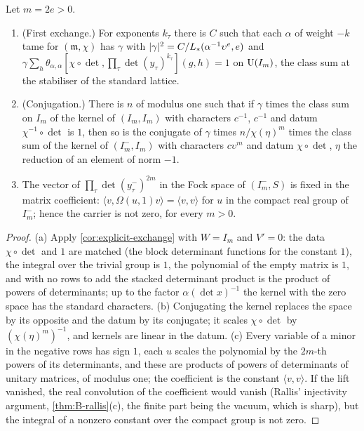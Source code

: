 \begin{lemma}\label{lem:carrier}
Let $m=2e>0$.
\begin{enumerate}[label=\textup{(\alph*)}]
\item (First exchange.) For exponents $k_\tau$ there is $C$ such that each $\alpha$ of weight $-k$ tame for $(\mathfrak m,\chi)$ has $\gamma$ with $\lvert \gamma\rvert^2=C/L_*(\alpha^{-1}\upsilon^e,e)$ and $\gamma\sum_h\theta_{\alpha,\alpha}[\chi\circ\det,\prod_\tau\det(y_\tau)^{k_\tau}](g,h)=1$ on
$\operatorname{U}(I_m)$, the class sum at the stabiliser of the standard lattice.
\item (Conjugation.) There is $n$ of modulus one such that if $\gamma$ times the class sum on $I_m$ of the kernel of $(I_m,I_m)$ with characters $c^{-1}$, $c^{-1}$ and datum $\chi^{-1}\circ\det$ is $1$, then so is the conjugate of $\gamma$ times
$n/\chi(\eta)^m$ times the class sum of the kernel of $(I_m^-,I_m)$ with characters $c\upsilon^m$ and datum $\chi\circ\det$, $\eta$ the reduction of an element of norm $-1$.
\item The vector of $\prod_\tau\det(y^-_\tau)^{2m}$ in the Fock space of $(I_m^-,S)$ is fixed in the matrix coefficient: $\langle v,\Omega(u,1)v\rangle=\langle v,v\rangle$ for $u$ in the compact real group of $I_m^-$; hence the carrier is not zero, for every $m>0$.
\end{enumerate}
\end{lemma}

\begin{proof}
(a) Apply \cref{cor:explicit-exchange} with $W=I_m$ and $V'=0$: the data $\chi\circ\det$ and $1$ are matched (the block determinant functions for the constant $1$), the integral over the trivial group is $1$, the polynomial of the
empty matrix is $1$, and with no rows to add the stacked determinant product is the product of powers of determinants; up to the factor $\alpha(\det x)^{-1}$ the kernel with the zero space has the standard characters.
(b) Conjugating the kernel replaces the space by its opposite and the datum by its conjugate; it scales $\chi\circ\det$ by $(\chi(\eta)^m)^{-1}$, and kernels are linear in the datum. (c) Every variable of a minor in the negative rows has sign
$1$, each $u$ scales the polynomial by the $2m$-th powers of its determinants, and these are products of powers of determinants of unitary matrices, of modulus one; the coefficient is the constant $\langle v,v\rangle$. If the lift
vanished, the real convolution of the coefficient would vanish (Rallis' injectivity argument, \cref{thm:B-rallis}(c), the finite part being the vacuum, which is sharp), but the integral of a nonzero constant over the compact group
is not zero.
\end{proof}


